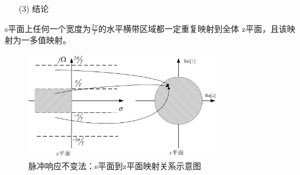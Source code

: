 \documentclass[notheorems,compress,mathserif,table]{beamer}
\begin{document}
\begin{frame}[shrink]\frametitle{}%
\begin{enumerate}
        \item [(3)]结论
\end{enumerate}
          s平面上任何一个宽度为$\frac{2\pi}{T}$的水平横带区域都一定重复映射到全体
          z平面，且该映射为一多值映射。
           \begin{figure}[h]
           \centering
           \includegraphics[width=0.75\textwidth]{fig15_MZspinmian2zpingmian.jpg}
           \caption{脉冲响应不变法：s平面到z平面映射关系示意图}
           \end{figure}

\end{frame}
%
%
\end{document}

